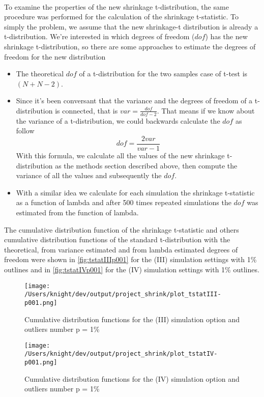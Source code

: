 \\
To examine the properties of the new shrinkage t-distribution, the same procedure was performed for the calculation of the shrinkage t-statistic. To simply the problem, we assume that the new shrinkage-t distribution is already a t-distribution. We're interested in which degrees of freedom ($dof$) has the new shrinkage t-distribution, so there are some approaches to estimate the degrees of freedom for the new distribution
\begin{itemize}
	\item The theoretical $dof$ of a t-distribution for the two samples case of t-test is $(N + N - 2)$.
	\item Since it's been conversant that the variance and the degrees of freedom of a t-distribution is connected, that is $var = \frac{dof}{dof - 2}$. That means if we know about the variance of a t-distribution, we could backwards calculate the $dof$ as follow
		\begin{equation*}
			dof = \frac{2var}{var - 1}
		\end{equation*}
		With this formula, we calculate all the values of the new shrinkage t-distribution as the methods section described above, then compute the variance of all the values and subsequently the $dof$.
	\item With a similar idea we calculate for each simulation the shrinkage t-statistic as a function of lambda and after 500 times repeated simulations the $dof$ was estimated from the function of lambda.
\end{itemize}
The cumulative distribution function of the shrinkage t-statistic and others cumulative distribution functions of the standard t-distribution with the theoretical, from variance estimated and from lambda estimated degrees of freedom were shown in \autoref{fig:tstatIIIp001} for the (III) simulation settings with 1\% outlines and in \autoref{fig:tstatIVp001} for the (IV) simulation settings with 1\% outlines.
\begin{figure}[h!tp]
	\centering
	\texttt{[image: /Users/knight/dev/output/project\_shrink/plot\_tstatIII-p001.png]}
	\caption[a]{Cumulative distribution functions for the (III) simulation option and outliers number p = 1\% }
	\label{fig:tstatIIIp001}
\end{figure}
\begin{figure}[h!tp]
	\centering
	\texttt{[image: /Users/knight/dev/output/project\_shrink/plot\_tstatIV-p001.png]}
	\caption[a]{Cumulative distribution functions for the (IV) simulation option and outliers number p = 1\% }
	\label{fig:tstatIVp001}
\end{figure}